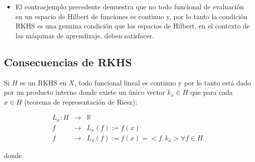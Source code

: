 \documentclass[12pt]{article}
\begin{document}
\begin{enumerate}
\begin{itemize}
\item
El contraejemplo precedente demuestra que no todo funcional de
evaluaci\'on en un espacio de Hilbert de funciones es continuo y,
por lo tanto la condici\'on RKHS es una genuina condici\'on que
los espacios de Hilbert, en el contexto de las m\'aquinas de
aprendizaje, deben satisfacer.
\end{itemize}
\end{enumerate}





\subsection{Consecuencias de RKHS}
Si $H$ es un RKHS en $X$, todo funcional lineal es continuo y por lo tanto está dado por un producto interno donde existe un único vector $k_x \in H$ que para cada $x \in H$ (teorema de representación de Riesz):


\begin{eqnarray*}
L_x: H &\rightarrow &\mathbb{R} \\
 f &\rightarrow & L_x(f):= f(x) \\
 f &\rightarrow & L_x(f):= f(x)= <f,k_x>  \forall f \in H
\end{eqnarray*}


donde
\end{document}
